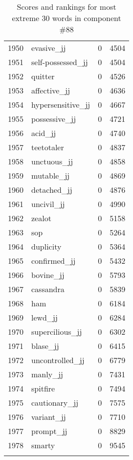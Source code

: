 \begin{longtable}[!htbp]{| rlr@{.}l |}
    1950 & evasive\_jj & 0 & 4504 \\
    1951 & self-possessed\_jj & 0 & 4504 \\
    1952 & quitter & 0 & 4526 \\
    1953 & affective\_jj & 0 & 4636 \\
    1954 & hypersensitive\_jj & 0 & 4667 \\
    1955 & possessive\_jj & 0 & 4721 \\
    1956 & acid\_jj & 0 & 4740 \\
    1957 & teetotaler & 0 & 4837 \\
    1958 & unctuous\_jj & 0 & 4858 \\
    1959 & mutable\_jj & 0 & 4869 \\
    1960 & detached\_jj & 0 & 4876 \\
    1961 & uncivil\_jj & 0 & 4990 \\
    1962 & zealot & 0 & 5158 \\
    1963 & sop & 0 & 5264 \\
    1964 & duplicity & 0 & 5364 \\
    1965 & confirmed\_jj & 0 & 5432 \\
    1966 & bovine\_jj & 0 & 5793 \\
    1967 & cassandra & 0 & 5839 \\
    1968 & ham & 0 & 6184 \\
    1969 & lewd\_jj & 0 & 6284 \\
    1970 & supercilious\_jj & 0 & 6302 \\
    1971 & blase\_jj & 0 & 6415 \\
    1972 & uncontrolled\_jj & 0 & 6779 \\
    1973 & manly\_jj & 0 & 7431 \\
    1974 & spitfire & 0 & 7494 \\
    1975 & cautionary\_jj & 0 & 7575 \\
    1976 & variant\_jj & 0 & 7710 \\
    1977 & prompt\_jj & 0 & 8829 \\
    1978 & smarty & 0 & 9545 \\
    \hline
    \caption{Scores and rankings for most extreme 30 words in component \#88} \\
\end{longtable}
